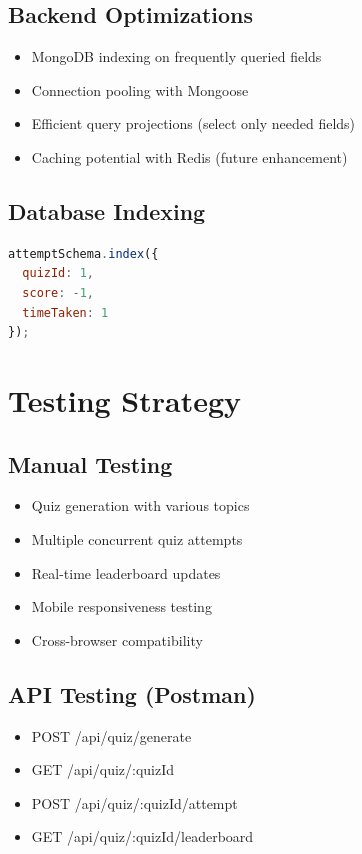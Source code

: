 \documentclass[12pt,a4paper]{article}
\begin{document}
\subsection{Backend Optimizations}
\begin{itemize}
    \item MongoDB indexing on frequently queried fields
    \item Connection pooling with Mongoose
    \item Efficient query projections (select only needed fields)
    \item Caching potential with Redis (future enhancement)
\end{itemize}

\subsection{Database Indexing}
\begin{lstlisting}[language=JavaScript]
attemptSchema.index({ 
  quizId: 1,
  score: -1,
  timeTaken: 1
});
\end{lstlisting}

\newpage

\section{Testing Strategy}

\subsection{Manual Testing}
\begin{itemize}
    \item Quiz generation with various topics
    \item Multiple concurrent quiz attempts
    \item Real-time leaderboard updates
    \item Mobile responsiveness testing
    \item Cross-browser compatibility
\end{itemize}

\subsection{API Testing (Postman)}
\begin{itemize}
    \item POST /api/quiz/generate
    \item GET /api/quiz/:quizId
    \item POST /api/quiz/:quizId/attempt
    \item GET /api/quiz/:quizId/leaderboard
\end{itemize}
\end{document}
